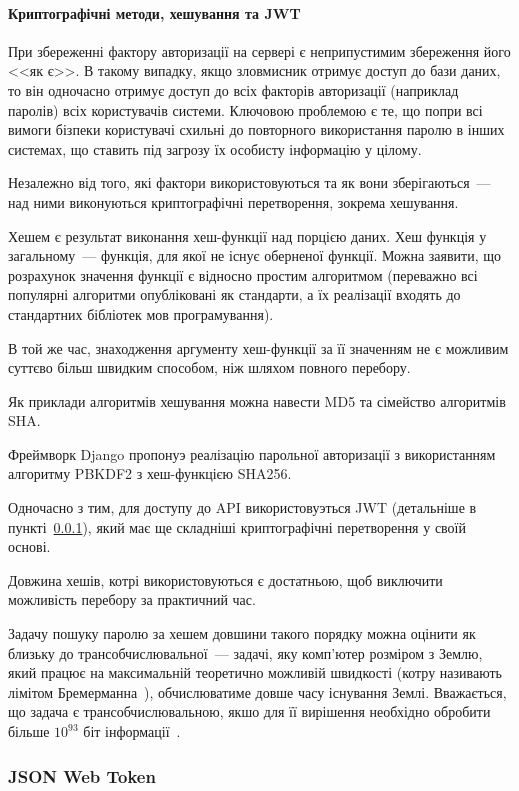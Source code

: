 \paragraph{Криптографічні методи, хешування та JWT}
При збереженні фактору авторизації на сервері є неприпустимим збереження його <<як є>>. В такому випадку, якщо зловмисник отримує доступ до бази даних, то він одночасно отримує доступ до всіх факторів авторизації (наприклад паролів) всіх користувачів системи. 
Ключовою проблемою є те, що попри всі вимоги бізпеки користувачі схильні до повторного використання паролю в інших системах, що ставить під загрозу їх особисту інформацію у цілому.

Незалежно від того, які фактори використовуються та як вони зберігаються~--- над ними виконуються криптографічні перетворення, зокрема хешування.

Хешем є результат виконання хеш-функції над порцією даних. Хеш функція у загальному~--- функція, для якої не існує оберненої функції. Можна заявити, що розрахунок значення функції є відносно простим алгоритмом (переважно всі популярні алгоритми опубліковані як стандарти, а їх реалізації входять до стандартних бібліотек мов програмування). 

В той же час, знаходження аргументу хеш-функції за її значенням не є можливим суттєво більш швидким способом, ніж шляхом повного перебору.

Як приклади алгоритмів хешування можна навести MD5 та сімейство алгоритмів SHA. 

Фреймворк Django пропонуэ реалізацію парольної авторизації з використанням алгоритму PBKDF2 з хеш-функцією SHA256. 

Одночасно з тим, для доступу до API використовуэться JWT (детальніше в пункті~\ref{subsubsection:jwt}), який має ще складніші криптографічні перетворення у своїй основі.

Довжина хешів, котрі використовуються є достатньою, щоб виключити можливість перебору за практичний час.

Задачу пошуку паролю за хешем довшини такого порядку можна оцінити як близьку до трансобчислювальної~--- задачі, яку комп'ютер розміром з Землю, який працює на максимальній теоретично можливій швидкості (котру називають лімітом Бремерманна~\cite{gatherer2007less}), обчислюватиме довше часу існування Землі. Вважається, що задача є трансобчислювальною, якшо для її вирішення необхідно обробити більше $10^{93}$ біт інформації~\cite{gatherer2007less}.

\subsubsection{JSON Web Token} \label{subsubsection:jwt}

